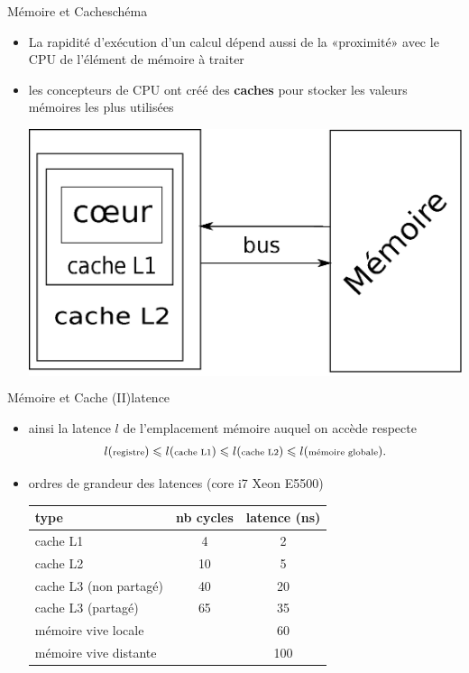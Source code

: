 \documentclass[11pt,mathserif]{beamer}
\newcommand{\gezi}{\faLongArrowRight}
\begin{document}
\begin{frame}{Mémoire et Cache}{schéma}
\begin{itemize}[<+->]
  \item La rapidité d'exécution d'un calcul dépend aussi de la «proximité» avec le CPU de l'élément de mémoire à traiter 
  \item[\gezi] les concepteurs de CPU ont créé des {\bf caches} pour stocker les valeurs mémoires les plus utilisées
  \begin{center}
    \colorbox{white}{\includegraphics[width=0.7\linewidth]{fig/cpu_classique.eps}}
  \end{center}
\end{itemize}
\end{frame}

\begin{frame}{Mémoire et Cache (II)}{latence}
\pause
  \begin{itemize}[<+->]
  \item ainsi la latence $l$ de l'emplacement mémoire auquel on accède  respecte
  $$l({\mbox{\scriptsize registre}}) \leqslant l(\mbox{\scriptsize cache L1}) \leqslant
    l(\mbox{\scriptsize cache L2}) \leqslant l(\mbox{\scriptsize mémoire globale}).$$
  \item ordres de grandeur des latences (core i7 Xeon E5500)
    \begin{tabular}{|l|c|c|}
    \hline
      type & nb cycles & latence (ns)  \\
    \hline
      cache L1  &  4 & 2 \\
      cache L2  &  10 & 5 \\
      cache L3 (non partagé) & 40 & 20  \\
      cache L3 (partagé) &  65 & 35  \\
      mémoire vive locale & & 60 \\
      mémoire vive distante & & 100 \\
    \hline
    \end{tabular}
  \end{itemize}
\end{frame}
\end{document}
